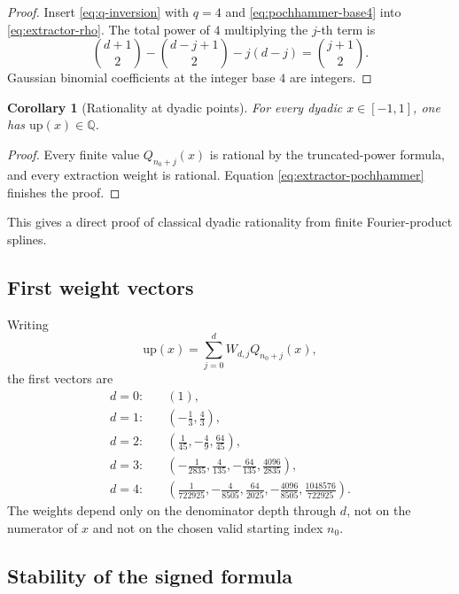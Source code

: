 \documentclass[11pt,oneside]{article}
\numberwithin{equation}{section}
\newtheorem{corollary}[theorem]{Corollary}
\theoremstyle{definition}
\theoremstyle{remark}
\newcommand{\Q}{\mathbb{Q}}
\newcommand{\upf}{\mathrm{up}}
\begin{document}
\begin{proof}
Insert \eqref{eq:q-inversion} with $q=4$ and
\eqref{eq:pochhammer-base4} into \eqref{eq:extractor-rho}.  The total power of
$4$ multiplying the $j$-th term is
\[
 \binom{d+1}{2}-\binom{d-j+1}{2}-j(d-j)
 =\binom{j+1}{2}.
\]
Gaussian binomial coefficients at the integer base $4$ are integers.
\end{proof}

\begin{corollary}[Rationality at dyadic points]
For every dyadic $x\in[-1,1]$, one has $\upf(x)\in\Q$.
\end{corollary}

\begin{proof}
Every finite value $Q_{n_0+j}(x)$ is rational by the truncated-power formula,
and every extraction weight is rational.  Equation
\eqref{eq:extractor-pochhammer} finishes the proof.
\end{proof}

This gives a direct proof of classical dyadic rationality from finite
Fourier-product splines.

\subsection{First weight vectors}

Writing
\begin{equation}
 \upf(x)=\sum_{j=0}^{d}W_{d,j}Q_{n_0+j}(x),
 \label{eq:weight-definition}
\end{equation}
the first vectors are
\begin{align}
 d=0:&\quad (1),\label{eq:w0}\\
 d=1:&\quad \left(-\frac13,\frac43\right),\label{eq:w1}\\
 d=2:&\quad \left(\frac1{45},-\frac49,\frac{64}{45}\right),\label{eq:w2}\\
 d=3:&\quad \left(-\frac1{2835},\frac4{135},-\frac{64}{135},
                    \frac{4096}{2835}\right),\label{eq:w3}\\
 d=4:&\quad \left(\frac1{722925},-\frac4{8505},\frac{64}{2025},
       -\frac{4096}{8505},\frac{1048576}{722925}\right).
 \label{eq:w4}
\end{align}
The weights depend only on the denominator depth through $d$, not on the
numerator of $x$ and not on the chosen valid starting index $n_0$.

\subsection{Stability of the signed formula}
\end{document}

